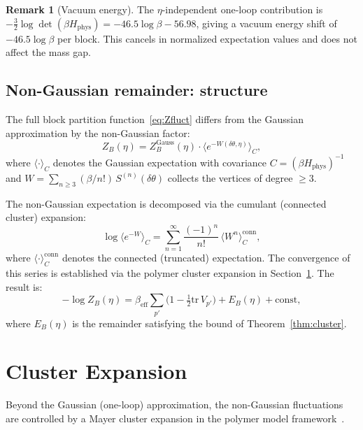 \documentclass[11pt]{article}
\theoremstyle{definition}
\newtheorem{remark}[theorem]{Remark}
\newcommand{\tr}{\mathrm{tr}}
\begin{document}
\begin{remark}[Vacuum energy]
The $\eta$-independent one-loop contribution is
$-\frac{3}{2}\log\det(\beta H_{\mathrm{phys}})
=-46.5\log\beta-56.98$, giving a vacuum energy shift of
$-46.5\log\beta$ per block.  This cancels in normalized expectation
values and does not affect the mass gap.
\end{remark}

\subsection{Non-Gaussian remainder: structure}\label{subsec:nongauss}

The full block partition function~\eqref{eq:Zfluct} differs from the
Gaussian approximation by the non-Gaussian factor:
\begin{equation}\label{eq:NG}
Z_B(\eta)=Z_B^{\mathrm{Gauss}}(\eta)\cdot
\bigl\langle e^{-W(\delta\theta,\eta)}\bigr\rangle_C,
\end{equation}
where $\langle\cdot\rangle_C$ denotes the Gaussian expectation with
covariance $C=(\beta H_{\mathrm{phys}})^{-1}$ and
$W=\sum_{n\ge 3}(\beta/n!)\,S^{(n)}(\delta\theta)$ collects the
vertices of degree $\ge 3$.

The non-Gaussian expectation is decomposed via the cumulant (connected
cluster) expansion:
\begin{equation}\label{eq:cumulant}
\log\bigl\langle e^{-W}\bigr\rangle_C
=\sum_{n=1}^\infty\frac{(-1)^n}{n!}\,\langle W^n\rangle_C^{\mathrm{conn}},
\end{equation}
where $\langle\cdot\rangle_C^{\mathrm{conn}}$ denotes the connected
(truncated) expectation.  The convergence of this series is established
via the polymer cluster expansion in Section~\ref{sec:cluster}.  The
result is:
\begin{equation}
-\log Z_B(\eta)=\beta_{\mathrm{eff}}\sum_{p'}
\bigl(1-\tfrac{1}{2}\tr\,V_{p'}\bigr)
+E_B(\eta)+\text{const},
\end{equation}
where $E_B(\eta)$ is the remainder satisfying the bound of
Theorem~\ref{thm:cluster}.

\section{Cluster Expansion}\label{sec:cluster}

Beyond the Gaussian (one-loop) approximation, the non-Gaussian
fluctuations are controlled by a Mayer cluster expansion in the
polymer model framework~\cite{Brydges86,KP}.
\end{document}
